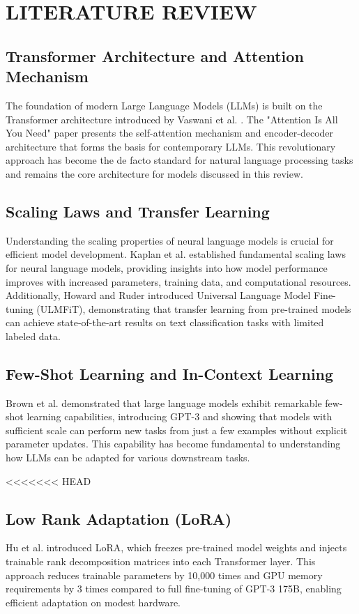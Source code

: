 \chapter{LITERATURE REVIEW}

\section{Transformer Architecture and Attention Mechanism}
The foundation of modern Large Language Models (LLMs) is built on the Transformer architecture introduced by Vaswani et al. \cite{Vaswani2017}. The "Attention Is All You Need" paper presents the self-attention mechanism and encoder-decoder architecture that forms the basis for contemporary LLMs. This revolutionary approach has become the de facto standard for natural language processing tasks and remains the core architecture for models discussed in this review.

\section{Scaling Laws and Transfer Learning}
Understanding the scaling properties of neural language models is crucial for efficient model development. Kaplan et al. \cite{Kaplan2020Scaling} established fundamental scaling laws for neural language models, providing insights into how model performance improves with increased parameters, training data, and computational resources. Additionally, Howard and Ruder \cite{Howard2018ULMFiT} introduced Universal Language Model Fine-tuning (ULMFiT), demonstrating that transfer learning from pre-trained models can achieve state-of-the-art results on text classification tasks with limited labeled data. 

\section{Few-Shot Learning and In-Context Learning}
Brown et al. \cite{Brown2020} demonstrated that large language models exhibit remarkable few-shot learning capabilities, introducing GPT-3 and showing that models with sufficient scale can perform new tasks from just a few examples without explicit parameter updates. This capability has become fundamental to understanding how LLMs can be adapted for various downstream tasks.

<<<<<<< HEAD
\section{Low Rank Adaptation (LoRA)}
Hu et al. \cite{Hu2021} introduced LoRA, which freezes pre-trained model weights and injects trainable rank decomposition matrices into each Transformer layer. This approach reduces trainable parameters by 10,000 times and GPU memory requirements by 3 times compared to full fine-tuning of GPT-3 175B, enabling efficient adaptation on modest hardware.

